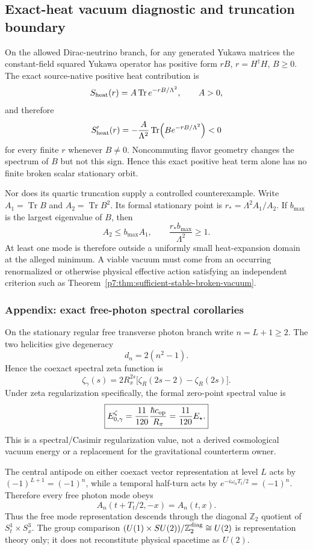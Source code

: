 \documentclass[11pt,a4paper]{article}
\begin{document}
\subsection{Exact-heat vacuum diagnostic and truncation boundary}
\label{p7:app:exact-heat-vacuum-diagnostic}
On the allowed Dirac-neutrino branch, for any generated Yukawa matrices the
constant-field squared Yukawa operator has positive form
\(rB\), \(r=H^\dagger H\), \(B\ge0\).  The exact source-native positive heat
contribution is
\[
 S_{\rm heat}(r)=A\operatorname{Tr}e^{-rB/\Lambda^2},
 \qquad A>0,
\]
and therefore
\[
 S_{\rm heat}'(r)
 =-\frac{A}{\Lambda^2}
   \operatorname{Tr}\!\left(Be^{-rB/\Lambda^2}\right)<0
\]
for every finite \(r\) whenever \(B\ne0\).  Noncommuting flavor geometry
changes the spectrum of \(B\) but not this sign.  Hence this exact positive
heat term alone has no finite broken scalar stationary orbit.

Nor does its quartic truncation supply a controlled counterexample.  Write
\(A_1=\operatorname{Tr}B\) and \(A_2=\operatorname{Tr}B^2\).  Its formal
stationary point is \(r_*=\Lambda^2A_1/A_2\).  If \(b_{\max}\) is the largest
eigenvalue of \(B\), then
\[
 A_2\le b_{\max}A_1,
 \qquad
 \frac{r_*b_{\max}}{\Lambda^2}\ge1.
\]
At least one mode is therefore outside a uniformly small heat-expansion
domain at the alleged minimum.  A viable vacuum must come from an occurring
renormalized or otherwise physical effective action satisfying an independent
criterion such as
Theorem~\ref{p7:thm:sufficient-stable-broken-vacuum}.

\subsubsection{Appendix: exact free-photon spectral corollaries}
\label{p7v2:app:v245-photon-spectral-corollaries}
On the stationary regular free transverse photon branch write
\(n=L+1\ge2\).  The two helicities give degeneracy
\[
 d_n=2(n^2-1).
\]
Hence the coexact spectral zeta function is
\[
 \boxed{\zeta_\gamma(s)
 =2R_x^{2s}\bigl[\zeta_R(2s-2)-\zeta_R(2s)\bigr].}
\]
Under zeta regularization specifically, the formal zero-point spectral value is
\[
 \boxed{E_{0,\gamma}^{\zeta}
 =\frac{11}{120}\frac{\hbar c_{\rm op}}{R_x}
 =\frac{11}{120}E_\star.}
\]
This is a spectral/Casimir regularization value, not a derived cosmological
vacuum energy or a replacement for the gravitational counterterm owner.

The central antipode on either coexact vector representation at level \(L\)
acts by \((-1)^{L+1}=(-1)^n\), while a temporal half-turn acts by
\(e^{-i\omega_nT_t/2}=(-1)^n\).  Therefore every free photon mode obeys
\[
 \boxed{A_n(t+T_t/2,-x)=A_n(t,x).}
\]
Thus the free mode representation descends through the diagonal
\(\mathbb Z_2\) quotient of \(S_t^1\times S_x^3\).  The group comparison
\((U(1)\times SU(2))/\mathbb Z_2^{\rm diag}\cong U(2)\) is representation
theory only; it does not reconstitute physical spacetime as \(U(2)\).
\end{document}
